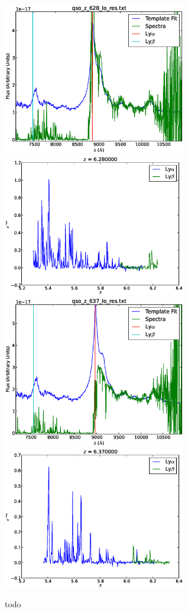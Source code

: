 \documentclass[11pt]{article}
\begin{document}
\begin{figure}[h]
  \centering
  \includegraphics[width=8cm]{qso_z_628_lo_res.eps}
  \includegraphics[width=8cm]{qso_z_628_lo_res_Transmission.eps}
  \includegraphics[width=8cm]{qso_z_637_lo_res.eps}
  \includegraphics[width=8cm]{qso_z_637_lo_res_Transmission.eps}
  \caption{todo}
  \label{fig:todo}
\end{figure}
\end{document}
